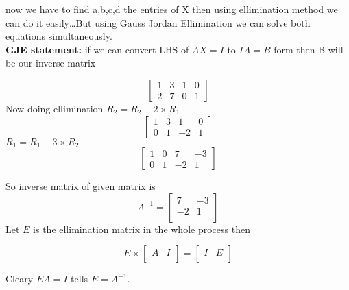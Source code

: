 \documentclass[a4paper,11pt]{article}
\numberwithin{equation}{section}
\begin{document}
\begin{itemize}
now we have to find a,b,c,d the entries of X then using ellimination method we can do it easily\dots But using Gauss Jordan Ellimination we can solve both equations simultaneously.\\

\textbf{GJE statement: }if we can convert LHS of $AX=I$ to $IA=B$ form then B will be our inverse matrix 

\begin{center}
    \[
        \left[\begin{array}{cc|cc}
            1 & 3 & 1 & 0\\
            2 & 7 & 0 & 1
        \end{array}
        \right]
    \]
    Now doing ellimination $R_2=R_2 -2 \times R_1$
    \[
        \left[\begin{array}{cc|cc}
            1 & 3 & 1 & 0\\
            0 & 1 & -2 & 1
        \end{array}
        \right]
    \]
        $R_1=R_1 -3 \times R_2$
    \[
        \left[\begin{array}{cc|cc}
            1 & 0 & 7 & -3\\
            0 & 1 & -2 & 1
        \end{array}
        \right]
    \]
\end{center}

So inverse matrix of given matrix is 
\begin{equation}
    A^{-1}=
    \begin{bmatrix}
        7 & -3\\
        -2 & 1\\
    \end{bmatrix}
\end{equation}
Let $E$ is the ellimination matrix in the whole process then 
        \begin{center}
            \[  E \times
                \left[\begin{array}{c|c}
                    A & I\\
                \end{array}
                \right]=
                \left[\begin{array}{c|c}
                    I & E\\
                \end{array}
                \right]
            \]
        \end{center}
Cleary $EA=I$ tells $E=A^{-1}$.\\


\end{itemize}
\end{document}
